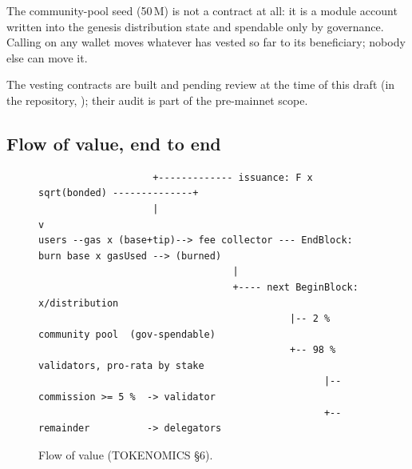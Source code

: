 The community-pool seed (50\,M) is not a contract at all: it is a module
account written into the genesis distribution state and spendable only by
governance. Calling  on any wallet moves whatever has vested so
far to its beneficiary; nobody else can move it.

The vesting contracts are built and pending review at the time of this draft
(in the  repository, ); their audit is part
of the pre-mainnet scope.

\subsection{Flow of value, end to end}

\begin{figure}[H]
\footnotesize
\begin{verbatim}
                    +------------- issuance: F x sqrt(bonded) --------------+
                    |                                                       v
users --gas x (base+tip)--> fee collector --- EndBlock: burn base x gasUsed --> (burned)
                                  |
                                  +---- next BeginBlock: x/distribution
                                            |-- 2 % community pool  (gov-spendable)
                                            +-- 98 % validators, pro-rata by stake
                                                  |-- commission >= 5 %  -> validator
                                                  +-- remainder          -> delegators
\end{verbatim}
\caption{Flow of value (TOKENOMICS \S6).}
\end{figure}
